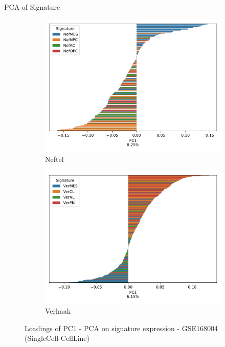 \documentclass[aspectratio=169,9pt]{beamer}
\begin{document}
    \begin{frame}{PCA of Signature}
        \begin{adjustwidth}{-5cm}{-5cm}
            \centering
            \begin{figure}\ContinuedFloat
                \centering
                \begin{subfigure}[c]{0.48\textwidth}
                    \centering
                    \includegraphics[width=\textwidth]{celllines_loadings_barplot_Nef}
                    \caption{Neftel}
                \end{subfigure}
                \begin{subfigure}[c]{0.48\textwidth}
                    \centering
                    \includegraphics[width=\textwidth]{celllines_loadings_barplot_Ver}
                    \caption{Verhaak}
                \end{subfigure}
                \caption{Loadings of PC1 - PCA on signature expression - GSE168004 (SingleCell-CellLine)}
            \end{figure}
        \end{adjustwidth}
    \end{frame}
\end{document}

